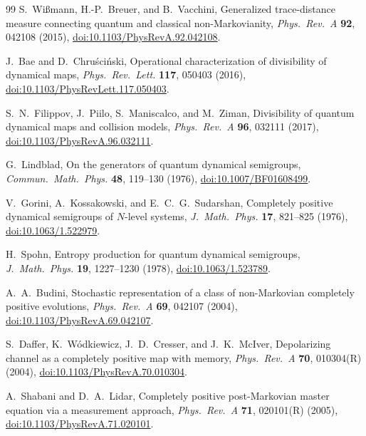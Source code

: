 \documentclass[twocolumn,10pt,amsmath,amssymb,floatfix]{revtex4-2}
\theoremstyle{plain}
\theoremstyle{definition}
\begin{document}
{\begin{thebibliography}{99}
S.~Wi\ss mann, H.-P.~Breuer, and B.~Vacchini,
Generalized trace-distance measure connecting quantum and classical non-Markovianity,
\emph{Phys.\ Rev.\ A} \textbf{92}, 042108 (2015),
\href{https://doi.org/10.1103/PhysRevA.92.042108}{doi:10.1103/PhysRevA.92.042108}.

J.~Bae and D.~Chru\'sci\'nski,
Operational characterization of divisibility of dynamical maps,
\emph{Phys.\ Rev.\ Lett.} \textbf{117}, 050403 (2016),
\href{https://doi.org/10.1103/PhysRevLett.117.050403}{doi:10.1103/PhysRevLett.117.050403}.

S.~N.~Filippov, J.~Piilo, S.~Maniscalco, and M.~Ziman,
Divisibility of quantum dynamical maps and collision models,
\emph{Phys.\ Rev.\ A} \textbf{96}, 032111 (2017),
\href{https://doi.org/10.1103/PhysRevA.96.032111}{doi:10.1103/PhysRevA.96.032111}.

G.~Lindblad,
On the generators of quantum dynamical semigroups,
\emph{Commun.\ Math.\ Phys.} \textbf{48}, 119--130 (1976),
\href{https://doi.org/10.1007/BF01608499}{doi:10.1007/BF01608499}.

V.~Gorini, A.~Kossakowski, and E.~C.~G.~Sudarshan,
Completely positive dynamical semigroups of $N$-level systems,
\emph{J.\ Math.\ Phys.} \textbf{17}, 821--825 (1976),
\href{https://doi.org/10.1063/1.522979}{doi:10.1063/1.522979}.

H.~Spohn,
Entropy production for quantum dynamical semigroups,
\emph{J.\ Math.\ Phys.} \textbf{19}, 1227--1230 (1978),
\href{https://doi.org/10.1063/1.523789}{doi:10.1063/1.523789}.

A.~A.~Budini,
Stochastic representation of a class of non-Markovian completely positive evolutions,
\emph{Phys.\ Rev.\ A} \textbf{69}, 042107 (2004),
\href{https://doi.org/10.1103/PhysRevA.69.042107}{doi:10.1103/PhysRevA.69.042107}.

S.~Daffer, K.~W\'odkiewicz, J.~D.~Cresser, and J.~K.~McIver,
Depolarizing channel as a completely positive map with memory,
\emph{Phys.\ Rev.\ A} \textbf{70}, 010304(R) (2004),
\href{https://doi.org/10.1103/PhysRevA.70.010304}{doi:10.1103/PhysRevA.70.010304}.

A.~Shabani and D.~A.~Lidar,
Completely positive post-Markovian master equation via a measurement approach,
\emph{Phys.\ Rev.\ A} \textbf{71}, 020101(R) (2005),
\href{https://doi.org/10.1103/PhysRevA.71.020101}{doi:10.1103/PhysRevA.71.020101}.


\end{thebibliography}}
\end{document}
